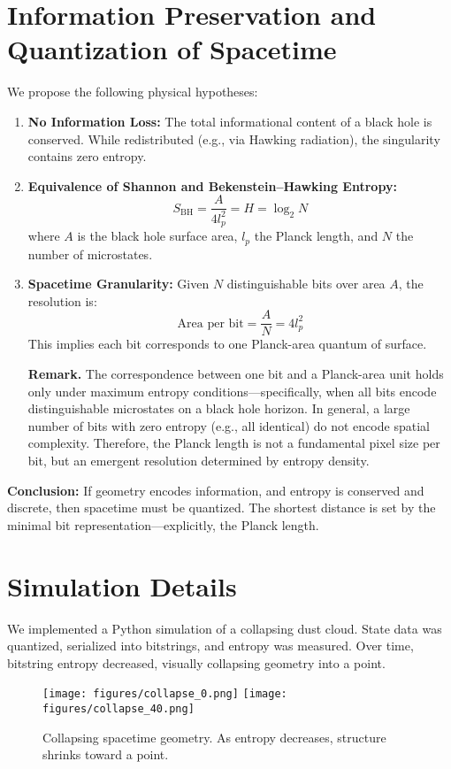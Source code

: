 \documentclass[11pt]{article}
\begin{document}
\section{Information Preservation and Quantization of Spacetime}

We propose the following physical hypotheses:
\begin{enumerate}
  \item \textbf{No Information Loss:} The total informational content of a black hole is conserved. While redistributed (e.g., via Hawking radiation), the singularity contains zero entropy.
  \item \textbf{Equivalence of Shannon and Bekenstein--Hawking Entropy:}
  \[
  S_{\text{BH}} = \frac{A}{4 l_p^2} = H = \log_2 N
  \]
  where $A$ is the black hole surface area, $l_p$ the Planck length, and $N$ the number of microstates.
  \item \textbf{Spacetime Granularity:} Given $N$ distinguishable bits over area $A$, the resolution is:
  \[
  \text{Area per bit} = \frac{A}{N} = 4 l_p^2
  \]
  This implies each bit corresponds to one Planck-area quantum of surface.
  
  \textbf{Remark.} The correspondence between one bit and a Planck-area unit holds only under maximum entropy conditions---specifically, when all bits encode distinguishable microstates on a black hole horizon. In general, a large number of bits with zero entropy (e.g., all identical) do not encode spatial complexity. Therefore, the Planck length is not a fundamental pixel size per bit, but an emergent resolution determined by entropy density.
\end{enumerate}

\textbf{Conclusion:} If geometry encodes information, and entropy is conserved and discrete, then spacetime must be quantized. The shortest distance is set by the minimal bit representation---explicitly, the Planck length.

\section{Simulation Details}

We implemented a Python simulation of a collapsing dust cloud. State data was quantized, serialized into bitstrings, and entropy was measured. Over time, bitstring entropy decreased, visually collapsing geometry into a point.

\begin{figure}[h!]
\centering
\texttt{[image: figures/collapse\_0.png]}
\texttt{[image: figures/collapse\_40.png]}
\caption{Collapsing spacetime geometry. As entropy decreases, structure shrinks toward a point.}
\label{fig:vanishing_entropy}
\end{figure}
\end{document}
